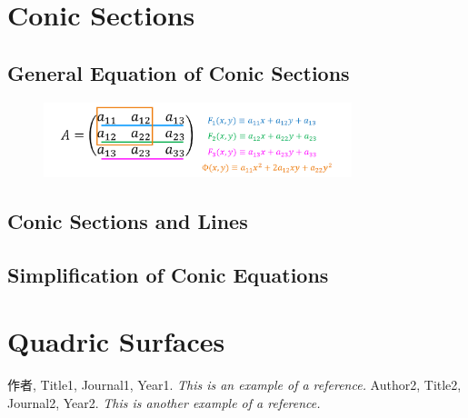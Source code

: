 \documentclass[11pt]{../../TexTemplate/elegantbook} %
\begin{document}
\chapter{Conic Sections}
\section{General Equation of Conic Sections}

\begin{figure}[h]
    \centering
    \includegraphics[width=0.8\textwidth]{img/ConicRelation.png}
\end{figure}

\section{Conic Sections and Lines}

\section{Simplification of Conic Equations}

\chapter{Quadric Surfaces}



\begin{thebibliography}{99} 
 作者, Title1, Journal1, Year1. \emph{ This is an example of a reference.}
 Author2, Title2, Journal2, Year2. \emph{ This is another example of a reference.}
\end{thebibliography}
\end{document}
